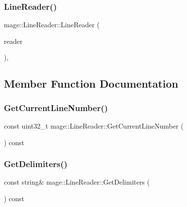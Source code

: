 \subsubsection{\texorpdfstring{Line\+Reader()}{LineReader()}\hspace{0.1cm}{\footnotesize\ttfamily [3/3]}}
{\footnotesize\ttfamily mage\+::\+Line\+Reader\+::\+Line\+Reader (\begin{DoxyParamCaption}\item[{\hyperlink{classmage_1_1_line_reader}{Line\+Reader} \&\&}]{reader }\end{DoxyParamCaption})\hspace{0.3cm}{\ttfamily [private]}, {\ttfamily [delete]}}



\subsection{Member Function Documentation}
\hypertarget{classmage_1_1_line_reader_ae7115d55bbb8a6e9b0764831624df33b}{}\label{classmage_1_1_line_reader_ae7115d55bbb8a6e9b0764831624df33b} 
\subsubsection{\texorpdfstring{Get\+Current\+Line\+Number()}{GetCurrentLineNumber()}}
{\footnotesize\ttfamily const uint32\+\_\+t mage\+::\+Line\+Reader\+::\+Get\+Current\+Line\+Number (\begin{DoxyParamCaption}{ }\end{DoxyParamCaption}) const\hspace{0.3cm}{\ttfamily [protected]}}

\hypertarget{classmage_1_1_line_reader_a7de405beff27d5cc55bb93e1b1e9727a}{}\label{classmage_1_1_line_reader_a7de405beff27d5cc55bb93e1b1e9727a} 
\subsubsection{\texorpdfstring{Get\+Delimiters()}{GetDelimiters()}}
{\footnotesize\ttfamily const string\& mage\+::\+Line\+Reader\+::\+Get\+Delimiters (\begin{DoxyParamCaption}{ }\end{DoxyParamCaption}) const}

